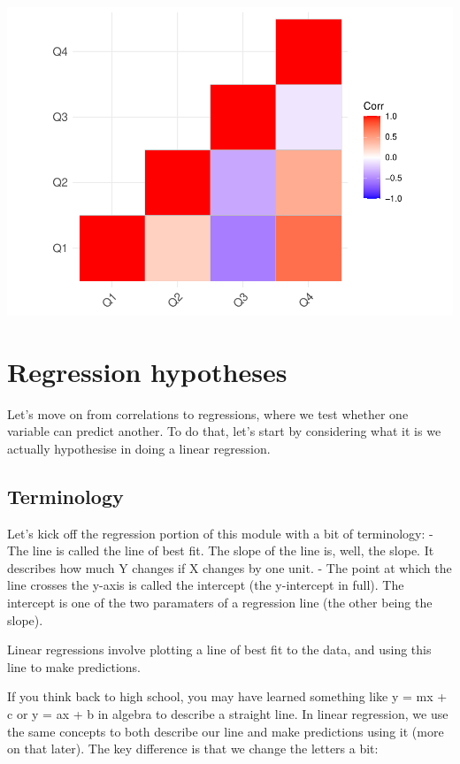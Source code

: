 \documentclass[
]{book}
\begin{document}
\includegraphics{_main_files/figure-latex/unnamed-chunk-201-1.pdf}

\section{Regression hypotheses}\label{regression-hypotheses}

Let's move on from correlations to regressions, where we test whether one variable can predict another. To do that, let's start by considering what it is we actually hypothesise in doing a linear regression.

\subsection{Terminology}\label{terminology}

Let's kick off the regression portion of this module with a bit of terminology:
- The line is called the line of best fit. The slope of the line is, well, the slope. It describes how much Y changes if X changes by one unit.
- The point at which the line crosses the y-axis is called the intercept (the y-intercept in full). The intercept is one of the two paramaters of a regression line (the other being the slope).

Linear regressions involve plotting a line of best fit to the data, and using this line to make predictions.

If you think back to high school, you may have learned something like y = mx + c or y = ax + b in algebra to describe a straight line. In linear regression, we use the same concepts to both describe our line and make predictions using it (more on that later). The key difference is that we change the letters a bit:
\end{document}
